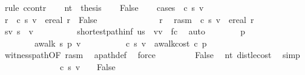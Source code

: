 \begin{isabellebody}
\ {\isacharparenleft}rule\ ccontr{\isacharparenright}\isanewline
\ \ \isamarkupfalse%
\ nt{\isacharcolon}\ {\isachardoublequoteopen}{\isasymnot}\ {\isacharquery}thesis{\isachardoublequoteclose}\isanewline
\ \ \isamarkupfalse%
\ False\isanewline
\ \ \isamarkupfalse%
\ {\isacharparenleft}cases\ {\isachardoublequoteopen}{\isasymmu}\ c\ s\ v{\isachardoublequoteclose}{\isacharparenright}\isanewline
\ \ \ \ \isamarkupfalse%
\ {\isachardoublequoteopen}{\isasymAnd}r{\isachardot}\ {\isasymmu}\ c\ s\ v\ {\isacharequal}\ ereal\ r\ {\isasymLongrightarrow}\ False{\isachardoublequoteclose}\isanewline
\ \ \ \ \isamarkupfalse%
\ {\isacharminus}\isanewline
\ \ \ \ \ \ \isamarkupfalse%
\ r\ \isamarkupfalse%
\ r{\isacharunderscore}asm{\isacharcolon}\ {\isachardoublequoteopen}{\isasymmu}\ c\ s\ v\ {\isacharequal}\ ereal\ r{\isachardoublequoteclose}\isanewline
\ \ \ \ \ \ \isamarkupfalse%
\ sv{\isacharcolon}\ {\isachardoublequoteopen}s\ {\isasymrightarrow}\isactrlsup {\isacharasterisk}\ v{\isachardoublequoteclose}\isanewline
\ \ \ \ \ \ \ \ \isamarkupfalse%
\ shortest{\isacharunderscore}path{\isacharunderscore}inf{\isacharbrackleft}\ u{\isacharequal}s\ \ v{\isacharequal}v\ \ f{\isacharequal}c{\isacharbrackright}\ \isamarkupfalse%
\ auto\isanewline
\ \ \ \ \ \ \isamarkupfalse%
\ p\ \ \isanewline
\ \ \ \ \ \ \ \ {\isachardoublequoteopen}awalk\ s\ p\ v{\isachardoublequoteclose}\ \isanewline
\ \ \ \ \ \ \ \ {\isachardoublequoteopen}{\isasymmu}\ c\ s\ v\ {\isacharequal}\ awalk{\isacharunderscore}cost\ c\ p{\isachardoublequoteclose}\isanewline
\ \ \ \ \ \ \ \ \isamarkupfalse%
\ witness{\isacharunderscore}path{\isacharbrackleft}OF\ r{\isacharunderscore}asm{\isacharbrackright}\ \isamarkupfalse%
\ apath{\isacharunderscore}def\ \isamarkupfalse%
\ force\ \isanewline
\ \ \ \ \ \ \isamarkupfalse%
\ False\ \isamarkupfalse%
\ nt\ dist{\isacharunderscore}le{\isacharunderscore}cost\ \isamarkupfalse%
\ simp\isanewline
\ \ \ \ \isamarkupfalse%
\isanewline
\ \ \isamarkupfalse%
\isanewline
\ \ \ \ \isamarkupfalse%
\ {\isachardoublequoteopen}{\isasymmu}\ c\ s\ v\ {\isacharequal}\ {\isasyminfinity}\ {\isasymLongrightarrow}\ False{\isachardoublequoteclose}\ \isamarkupfalse%

\end{isabellebody}
